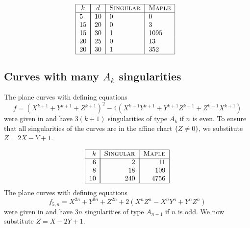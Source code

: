 \documentclass[a4paper,11pt]{amsart}%
\theoremstyle{definition}
\theoremstyle{plain}
\theoremstyle{remark}
\begin{document}
\[%
\begin{tabular}
[c]{|c|c|l|l|}\hline
$k$ & \multicolumn{1}{|c|}{$d$} & \textsc{Singular} & \textsc{Maple}\\\hline
\multicolumn{1}{|l|}{$5$} & \multicolumn{1}{|l|}{$10$} & $0$ & $0$\\
\multicolumn{1}{|l|}{$15$} & \multicolumn{1}{|l|}{$20$} & $0$ & $3$\\
\multicolumn{1}{|l|}{$15$} & \multicolumn{1}{|l|}{$30$} & $1$ & $1095$\\
\multicolumn{1}{|l|}{$20$} & \multicolumn{1}{|l|}{$25$} & $0$ & $13$\\
\multicolumn{1}{|l|}{$20$} & \multicolumn{1}{|l|}{$30$} & $1$ & $352$\\\hline
\end{tabular}
\ \
\]


\subsection{Curves with many \texorpdfstring{$A_{k}$}{Ak} singularities}

The plane curves with defining equations
\[
f=\left(  X^{k+1}+Y^{k+1}+Z^{k+1}\right)  ^{2}-4\left(  X^{k+1}Y^{k+1}%
+Y^{k+1}Z^{k+1}+Z^{k+1}X^{k+1}\right)
\]
were given in \cite{Hirano1992} and have $3\left(  k+1\right)  $ singularities
of type $A_{k}$ if $n$ is even. To ensure that all singularities of the curves
are in the affine chart $\{Z\neq0\}$, we substitute $Z=2X-Y+1$.

\[%
\begin{tabular}
[c]{|r|l|l|}\hline
$k$ & \textsc{Singular} & \textsc{Maple}\\\hline
$6$ & \multicolumn{1}{|r|}{$2$} & \multicolumn{1}{|r|}{$11$}\\
$8$ & \multicolumn{1}{|r|}{$18$} & \multicolumn{1}{|r|}{$109$}\\
$10$ & \multicolumn{1}{|r|}{$240$} & \multicolumn{1}{|r|}{$4756$}\\\hline
\end{tabular}
\]
The plane curves with defining equations
\[
f_{5,n}=X^{2n}+Y^{2n}+Z^{2n}+2(X^{n}Z^{n}-X^{n}Y^{n}+Y^{n}Z^{n})
\]
were given in \cite{Cogolludo1999} and have $3n$ singularities of type
$A_{n-1}$ if $n$ is odd. We now substitute $Z=X-2Y+1$.
\end{document}
